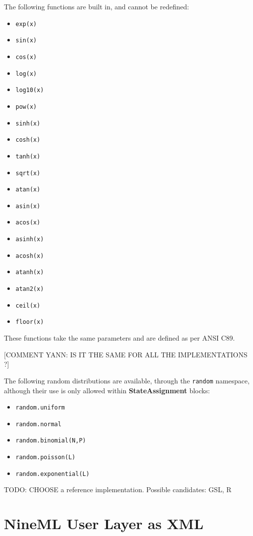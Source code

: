 \documentclass{article}
\newcommand{\StateAssignment}{{\bf{StateAssignment}}\xspace}
\begin{document}
The following functions are built in, and cannot be redefined:
\begin{itemize}
\item \verb|exp(x)|
\item \verb|sin(x)|
\item \verb|cos(x)|
\item \verb|log(x)|
\item \verb|log10(x)|
\item \verb|pow(x)|
\item \verb|sinh(x)|
\item \verb|cosh(x)|
\item \verb|tanh(x)|
\item \verb|sqrt(x)|
\item \verb|atan(x)|
\item \verb|asin(x)|
\item \verb|acos(x)|
\item \verb|asinh(x)|
\item \verb|acosh(x)|
\item \verb|atanh(x)|
\item \verb|atan2(x)|
\item \verb|ceil(x)|
\item \verb|floor(x)|
\end{itemize}

These functions take the same parameters and are defined as per ANSI C89.

[COMMENT YANN: IS IT THE SAME FOR ALL THE IMPLEMENTATIONS ?]

The following random distributions are available, through the \verb|random|
namespace,
although their use is only allowed within \StateAssignment blocks:

\begin{itemize}
\item \verb|random.uniform|
\item \verb|random.normal|
\item \verb|random.binomial(N,P)|
\item \verb|random.poisson(L)|
\item \verb|random.exponential(L)|
\end{itemize}

TODO: CHOOSE a reference implementation. Possible candidates: GSL, R

\pagebreak

\section{NineML User Layer as XML}
\end{document}
